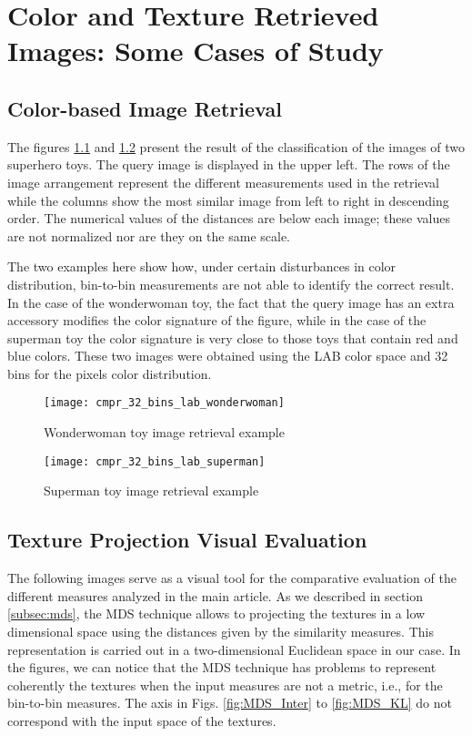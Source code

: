 
\chapter{Color and Texture Retrieved Images: Some Cases of Study}\label{ch:suplementary_material_retrieval_systems}

\section{Color-based Image Retrieval}\label{sec:sm_color:class}
The figures \ref{fig:wonderwoman_distances} and \ref{fig:superman_distances} present the result of the classification of the images of two superhero toys. The query image is displayed in the upper left. The rows of the image arrangement represent the different measurements used in the retrieval while the columns show the most similar image from left to right in descending order. The numerical values of the distances are below each image; these values are not normalized nor are they on the same scale.

The two examples here show how, under certain disturbances in color distribution, bin-to-bin measurements are not able to identify the correct result. In the case of the wonderwoman toy, the fact that the query image has an extra accessory modifies the color signature of the figure, while in the case of the superman toy the color signature is very close to those toys that contain red and blue colors. These two images were obtained using the LAB color space and 32 bins for the pixels color distribution.
\begin{figure}[!ht]
 \centering    
 \texttt{[image: cmpr\_32\_bins\_lab\_wonderwoman]}
 \caption{Wonderwoman toy image retrieval example}
 \label{fig:wonderwoman_distances}
\end{figure}

\begin{figure}[!ht]
 \centering    
 \texttt{[image: cmpr\_32\_bins\_lab\_superman]}
 \caption{Superman toy image retrieval example}
 \label{fig:superman_distances}
\end{figure}

\pagebreak
\section{Texture Projection Visual Evaluation}\label{sec:sm_mds}

The following images serve as a visual tool for the comparative evaluation of the different measures analyzed in the main article. As we described in section \ref{subsec:mds}, the MDS technique allows to projecting the textures in a low dimensional space using the distances given by the similarity measures. This representation is carried out in a two-dimensional Euclidean space in our case. In the figures, we can notice that the MDS technique has problems to represent coherently the textures when the input measures are not a metric, i.e., for the bin-to-bin measures. The axis in  Figs. \ref{fig:MDS_Inter} to \ref{fig:MDS_KL} do not correspond with the input space of the textures. 

